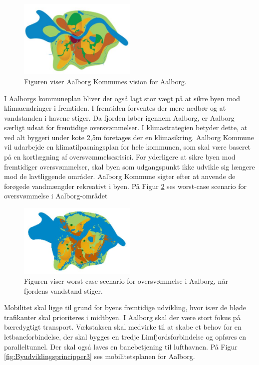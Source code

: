 \begin{figure}[H] 
\centering
\includegraphics[width=0.50\textwidth]{billeder/Byudviklingsprincipper1}
\caption{Figuren viser Aalborg Kommunes vision for Aalborg.}
\label{fig:Byudviklingsprincipper1}
\end{figure}

I Aalborgs kommuneplan bliver der også lagt stor vægt på at sikre byen mod klimaændringer i fremtiden. I fremtiden forventes der mere nedbør og at vandstanden i havene stiger. Da fjorden løber igennem Aalborg, er Aalborg særligt udsat for fremtidige oversvømmelser. I klimastrategien betyder dette, at ved alt byggeri under kote 2,5m foretages der en klimasikring. Aalborg Kommune vil udarbejde en klimatilpasningsplan for hele kommunen, som skal være baseret på en kortlægning af oversvømmelsesrisici. For yderligere at sikre byen mod fremtidiger oversvømmelser, skal byen som udgangspunkt ikke udvikle sig længere mod de lavtliggende områder. Aalborg Kommune sigter efter at anvende de forøgede vandmængder rekreativt i byen. På Figur \ref{fig:Byudviklingsprincipper2} ses worst-case scenario for oversvømmelse i Aalborg-området 

\begin{figure}[H] 
\centering
\includegraphics[width=0.50\textwidth]{billeder/Byudviklingsprincipper2}
\caption{Figuren viser worst-case scenario for oversvømmelse i Aalborg, når fjordens vandstand stiger.}
\label{fig:Byudviklingsprincipper2}
\end{figure}

Mobilitet skal ligge til grund for byens fremtidige udvikling, hvor især de bløde trafikanter skal prioriteres i midtbyen. I Aalborg skal der være stort fokus på bæredygtigt transport. Vækstaksen skal medvirke til at skabe et behov for en letbaneforbindelse, der skal bygges en tredje Limfjordsforbindelse og opføres en paralleltunnel. Der skal også laves en banebetjening til lufthavnen. På Figur \ref{fig:Byudviklingsprincipper3} ses mobilitetsplanen for Aalborg.

